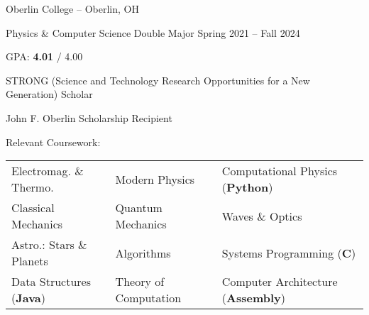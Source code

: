 \begin{entry}{Oberlin College -- Oberlin, OH}

	\entryItem
		{Physics \& Computer Science Double Major}
		{Spring 2021 -- Fall 2024}

	\begin{items}
		\item GPA: \textbf{4.01} / 4.00
		
		\item STRONG (Science and Technology Research Opportunities for a New Generation) Scholar

		\item John F. Oberlin Scholarship Recipient
		
		\item Relevant Coursework:
		
			\begin{tabular}{lll}
				Electromag. \& Thermo. & Modern Physics & Computational Physics (\textbf{Python}) \\
				Classical Mechanics & Quantum Mechanics & Waves \& Optics \\
				Astro.: Stars \& Planets & Algorithms & Systems Programming (\textbf{C}) \\
				Data Structures (\textbf{Java}) & Theory of Computation & Computer Architecture (\textbf{Assembly}) \\
			\end{tabular}
	\end{items}

\end{entry}
